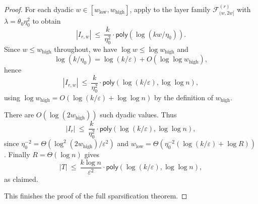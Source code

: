 \documentclass[10pt,a4paper]{amsart}
\DeclareMathOperator{\high}{\mathrm{high}}
\DeclareMathOperator{\low}{\mathrm{low}}
\newcommand{\calF}{\mathcal{F}}
\newcommand{\poly}{\mathsf{poly}}
\begin{document}
\begin{proof}
For each dyadic $w\in[w_{\low},w_{\high}]$, apply
 to the layer family
$\calF^{(r)}_{(w,2w]}$ with $\lambda = \theta_0 \eta_0^2$ to obtain
\[
|I_{r,w}|
\ \le\
\frac{k}{\eta_0^2}\cdot \poly\!\left(\log(kw/\eta_0)\right).
\]
Since $w\le w_{\high}$ throughout, we have $\log w\le \log w_{\high}$ and
\[
\log(k/\eta_0)=\log(k/\varepsilon)+O(\log\log w_{\high}),
\]
hence
\[
|I_{r,w}|
\ \le\
\frac{k}{\eta_0^2}\cdot \poly\!\left(\log(k/\varepsilon),\log\log n\right),
\]
using $\log w_{\high} = O(\log(k/\varepsilon)+\log\log n)$ by the definition of $w_{\high}$.

There are $O(\log(2w_{\high}))$ such dyadic values. Thus
\[
|I_r|
\ \le\
\frac{k}{\eta_0^2}\cdot \poly\!\left(\log(k/\varepsilon),\log\log n\right),
\]
since $\eta_0^{-2}=\Theta(\log^2(2w_{\high})/\varepsilon^2)$ and
$w_{\low}=\Theta(\eta_0^{-2}(\log(k/\varepsilon)+\log R))$.
Finally $R=\Theta(\log n)$ gives
\[
|T|
\ \le\
\frac{k\log n}{\varepsilon^2}\cdot \poly\!\left(\log(k/\varepsilon),\log\log n\right),
\]
as claimed.

This finishes the proof of the full sparsification theorem.
\end{proof}
\end{document}
